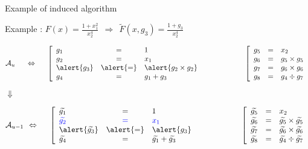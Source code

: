 \begin{frame}{Example of induced algorithm}

    \begin{block}{Example : $F(x) = \frac{1+x_1^2}{x_2^4}\ \ \Rightarrow\ \ \widetilde{F}(x,g_3) = \frac{1+g_3}{x_2^4}$}

{\centering%
    $
    \Au
    \hskip 0.5cm
    \Leftrightarrow
    \hskip 0.5cm
    \left [
    \begin{array}{l c l}
        g_1 & = & 1 \\   
        g_2 & = & x_1 \\   
        \alert{g_3} & \alert{=} & \alert{g_2 \times g_2} \\  
        g_4 & = & g_1 + g_3 \\
    \end{array}
    \right.
    \hskip 2cm
    \left[
    \begin{array}{l c l}
        g_5 & = & x_2 \\   
        g_6 & = & g_5 \times g_5 \\   
        g_7 & = & g_6 \times g_6 \\  
        g_8 & = & g_4 \div g_7 \\
    \end{array}
    \right.
    $
}

    $\Downarrow$
    
{\centering%
    $ 
    \Auu
    \hskip 0.15cm
    \Leftrightarrow
    \hskip 0.5cm
    \left[
    \begin{array}{l c l}
        \g{1} & = & 1 \\   
        \textcolor{blue}{\g{2}} & \textcolor{blue}{=} & \textcolor{blue}{x_1} \\   
        \alert{\g{3}} & \alert{=} & \alert{g_3} \\
        \g{4} & = & \g{1} + \g{3} \\
    \end{array}
    \right.
    \hskip 2cm
    \left[
    \begin{array}{l c l}
        \g{5} & = & x_2 \\   
        \g{6} & = & \g{5} \times \g{5} \\   
        \g{7} & = & \g{6} \times \g{6} \\  
        \g{8} & = & \g{4} \div \g{7} \\
    \end{array}
    \right.
    $
}

\end{block}
\end{frame}

